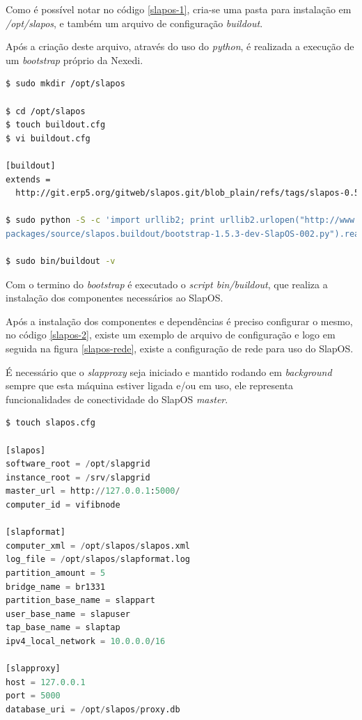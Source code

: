 Como é possível notar no código \ref{slapos-1}, cria-se uma pasta para instalação em \textit{/opt/slapos}, e também um arquivo de configuração \textit{buildout}.

Após a criação deste arquivo, através do uso do \textit{python}, é realizada a execução de um \textit{bootstrap} próprio da Nexedi.

{\singlespace
\begin{lstlisting}[caption=Primeira parte da instalação do SlapOS,language=bash,label={slapos-1}]
$ sudo mkdir /opt/slapos 

$ cd /opt/slapos
$ touch buildout.cfg
$ vi buildout.cfg

[buildout]
extends =
  http://git.erp5.org/gitweb/slapos.git/blob_plain/refs/tags/slapos-0.57:/component/slapos/buildout.cfg

$ sudo python -S -c 'import urllib2; print urllib2.urlopen("http://www.nexedi.org/static/\
packages/source/slapos.buildout/bootstrap-1.5.3-dev-SlapOS-002.py").read()' | python -S -

$ sudo bin/buildout -v
\end{lstlisting}
}

Com o termino do \textit{bootstrap} é executado o \textit{script bin/buildout}, que realiza a instalação dos componentes necessários ao SlapOS.


Após a instalação dos componentes e dependências é preciso configurar o mesmo, no código \ref{slapos-2}, existe um exemplo de arquivo de configuração e logo em seguida na figura \ref{slapos-rede}, existe a configuração de rede para uso do SlapOS.

É necessário que o \textit{slapproxy} seja iniciado e mantido rodando em \textit{background} sempre que esta máquina estiver ligada e/ou em uso, ele representa funcionalidades de conectividade do SlapOS \textit{master}.

{\singlespace
\begin{lstlisting}[caption=Arquivo de configuração do SlapOS,language=python,label={slapos-2}]
$ touch slapos.cfg

[slapos]
software_root = /opt/slapgrid
instance_root = /srv/slapgrid
master_url = http://127.0.0.1:5000/
computer_id = vifibnode

[slapformat]
computer_xml = /opt/slapos/slapos.xml
log_file = /opt/slapos/slapformat.log
partition_amount = 5
bridge_name = br1331
partition_base_name = slappart
user_base_name = slapuser
tap_base_name = slaptap
ipv4_local_network = 10.0.0.0/16

[slapproxy]
host = 127.0.0.1
port = 5000
database_uri = /opt/slapos/proxy.db

\end{lstlisting}
}

